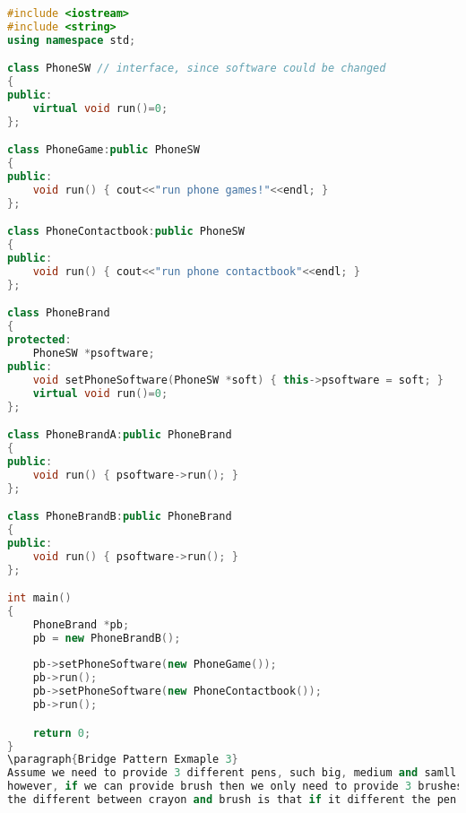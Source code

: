 \documentclass{book}
\begin{document}
\begin{lstlisting}[caption={Bridge Pattern sample code 2},label={lst:bridgepsc2},language=C++]
#include <iostream>
#include <string>
using namespace std;

class PhoneSW // interface, since software could be changed
{
public:
	virtual void run()=0;
};

class PhoneGame:public PhoneSW 
{
public:
	void run() { cout<<"run phone games!"<<endl; }
};

class PhoneContactbook:public PhoneSW 
{
public:
	void run() { cout<<"run phone contactbook"<<endl; }
};

class PhoneBrand 
{
protected:
	PhoneSW *psoftware;
public:
	void setPhoneSoftware(PhoneSW *soft) { this->psoftware = soft; }
	virtual void run()=0;
};

class PhoneBrandA:public PhoneBrand 
{
public:
	void run() { psoftware->run(); }
};

class PhoneBrandB:public PhoneBrand 
{
public:
	void run() { psoftware->run(); }
};

int main()
{
	PhoneBrand *pb;
	pb = new PhoneBrandB();
	
	pb->setPhoneSoftware(new PhoneGame());
	pb->run();
	pb->setPhoneSoftware(new PhoneContactbook());
	pb->run();

	return 0;
}
\paragraph{Bridge Pattern Exmaple 3}
Assume we need to provide 3 different pens, such big, medium and samll and also need to draw 5 different colors. if we use crayon then we need to provide 3\*5=15 crayons.
however, if we can provide brush then we only need to provide 3 brushes plus 5 different color box, this combination can do the same work as 15 crayons.
the different between crayon and brush is that if it different the pen tool and color.


\end{lstlisting}
\end{document}
